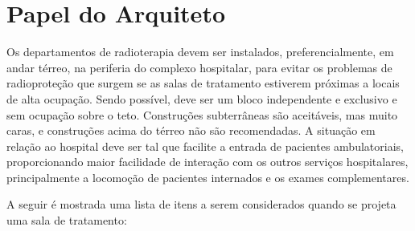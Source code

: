 \documentclass[
	12pt,				%
    oneside,			%
	a4paper,			%
	english,			%
	french,				%
	spanish,			%
	brazil,				%
	]{abntex2}
\begin{document}
\section{Papel do Arquiteto}

Os departamentos de radioterapia devem ser instalados, preferencialmente, em andar térreo, na periferia do complexo hospitalar, para evitar os problemas de radioproteção que surgem se as salas de tratamento estiverem próximas a locais de alta ocupação. Sendo possível, deve ser um bloco independente e exclusivo e sem ocupação sobre o teto. Construções subterrâneas são aceitáveis, mas muito caras, e construções acima do térreo não são recomendadas. A situação em relação ao hospital deve ser tal que facilite a entrada de pacientes ambulatoriais, proporcionando maior facilidade de interação com os outros serviços hospitalares, principalmente a locomoção de pacientes internados e os exames complementares.

A seguir é mostrada uma lista de itens a serem considerados quando se projeta uma sala de tratamento:
\end{document}
